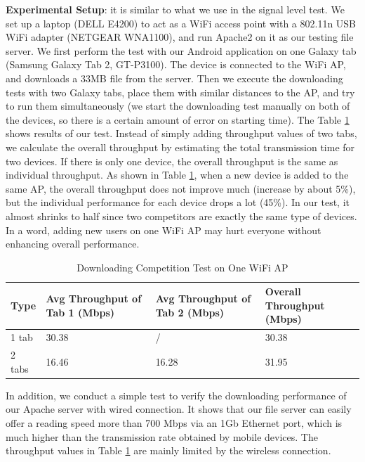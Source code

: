 \documentclass[english]{tktltiki}
\begin{document}
\textbf{Experimental Setup}: it is similar to what we use in the signal level test. We set up a laptop (DELL E4200) to act as a WiFi access point with a 802.11n USB WiFi adapter (NETGEAR WNA1100), and run Apache2 on it as our testing file server. We first perform the test with our Android application on one Galaxy tab (Samsung Galaxy Tab 2, GT-P3100). The device is connected to the WiFi AP, and downloads a 33MB file from the server. Then we execute the downloading tests with two Galaxy tabs, place them with similar distances to the AP, and try to run them simultaneously (we start the downloading test manually on both of the devices, so there is a certain amount of error on starting time). The Table \ref{tab:competition} shows results of our test. Instead of simply adding throughput values of two tabs, we calculate the overall throughput by estimating the total transmission time for two devices. If there is only one device, the overall throughput is the same as individual throughput. As shown in Table \ref{tab:competition}, when a new device is added to the same AP, the overall throughput does not improve much (increase by about 5\%), but the individual performance for each device drops a lot (45\%). In our test, it almost shrinks to half since two competitors are exactly the same type of devices. In a word, adding new users on one WiFi AP may hurt everyone without enhancing overall performance.

\begin{table}
  \centering
  \begin{tabular}{|p{40pt}|p{110pt}|p{110pt}|p{105pt}|}
    \hline
    \textbf{Type} & \textbf{Avg Throughput of Tab 1 (Mbps)} & \textbf{Avg Throughput of Tab 2 (Mbps)} & \textbf{Overall Throughput (Mbps)} \\    
    \hline
    1 tab & 30.38 & / & 30.38 \\
    \hline
    2 tabs & 16.46 & 16.28 & 31.95 \\
    \hline
  \end{tabular}
  \caption{Downloading Competition Test on One WiFi AP}
  \label{tab:competition}
\end{table}

In addition, we conduct a simple test to verify the downloading performance of our Apache server with wired connection. It shows that our file server can easily offer a reading speed more than 700 Mbps via an 1Gb Ethernet port, which is much higher than the transmission rate obtained by mobile devices. The throughput values in Table \ref{tab:competition} are mainly limited by the wireless connection. 
\end{document}
